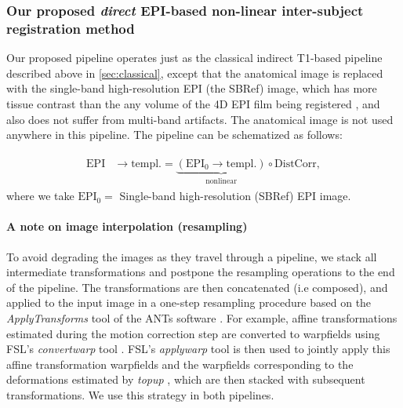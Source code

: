 
\subsubsection{Our proposed \textit{direct} EPI-based non-linear  inter-subject
  registration method}
\label{sec:proposed}
Our proposed pipeline operates just as the
classical indirect T1-based pipeline described above in
\ref{sec:classical}, except that the anatomical image is replaced with
the single-band high-resolution EPI (the SBRef) image, which has more tissue contrast than the any volume of the 4D EPI film being registered
\citep{glasser2013}, and also does not suffer from multi-band artifacts. The anatomical image is not used anywhere in
this pipeline.  The pipeline can be schematized as follows:

\begin{eqnarray}
  \begin{split}
    \text{EPI} &\rightarrow \text{templ.}
    = \underbrace{(\text{EPI}_0 \rightarrow \text{templ.})}_{\text{nonlinear}} \circ  \text{DistCorr},
    \label{eq:dcsbref_pl}
    \end{split}
\end{eqnarray}
where we take $\text{EPI}_0 = $ Single-band high-resolution (SBRef) EPI image.

\paragraph{A note on image interpolation (resampling)}
To avoid degrading the images as they travel through a pipeline, we
stack all intermediate transformations and postpone the resampling
operations to the end of the pipeline. The transformations are then
concatenated (i.e composed), and applied to the input image in a
one-step resampling procedure based on the \textit{ApplyTransforms}
tool of the ANTs software \citep{avants2008,avants2009advanced}. For
example,  affine transformations estimated during the
motion correction step are converted to warpfields using FSL's
\textit{convertwarp} tool \citep{smith2004}. FSL's \textit{applywarp}
tool \citep{smith2004} is then used to jointly apply this affine
transformation warpfields and the warpfields corresponding to the
deformations estimated by \textit{topup} \citep{smith2004}, which
are then stacked with subsequent transformations. We use this strategy in both pipelines.


